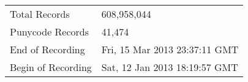 \begin{table}[h!tp]
  \begin{tabular}{ll}
  \toprule
    Total Records      & 608,958,044 \\
    Punycode Records   & 41,474 \\
    End of Recording   & Fri, 15 Mar 2013 23:37:11 GMT \\
    Begin of Recording & Sat, 12 Jan 2013 18:19:57 GMT \\
  \midrule
  \end{tabular}
\end{table}



